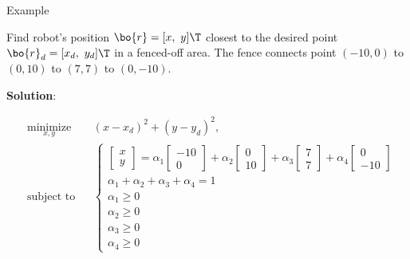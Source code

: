 \documentclass{beamer}
\begin{document}
\begin{frame}{Example}
	\begin{flushleft}
		
		Find robot's position $\bo{r} = [x, \ y]\T$  closest to the desired point $\bo{r}_d= [x_d, \ y_d]\T$ in a fenced-off area. The fence connects point $(-10, 0)$ to $(0, 10)$ to $(7, 7)$ to $(0, -10)$.
		
		\bigskip
		
		\textbf{Solution}:
		
		\begin{equation}
			\begin{aligned}
				& \underset{x, y}{\text{minimize}}
				& & (x-x_d)^2 + (y-y_d)^2, \\
				& \text{subject to}
				& & 
				\begin{cases}
					\begin{bmatrix} x \\y \end{bmatrix}
					=
					\alpha_1
					\begin{bmatrix} -10 \\0 \end{bmatrix}
					+
					\alpha_2
					\begin{bmatrix} 0 \\10 \end{bmatrix}
					+
					\alpha_3
					\begin{bmatrix} 7 \\7 \end{bmatrix}
					+
					\alpha_4
					\begin{bmatrix} 0 \\ -10 \end{bmatrix}
					\\
					\alpha_1 + \alpha_2 + \alpha_3 + \alpha_4 = 1
					\\
					\alpha_1 \geq 0 \\  \alpha_2 \geq 0 \\  \alpha_3 \geq 0 \\  \alpha_4 \geq 0
				\end{cases}
			\end{aligned}
		\end{equation}
		
	\end{flushleft}
\end{frame}
\end{document}
